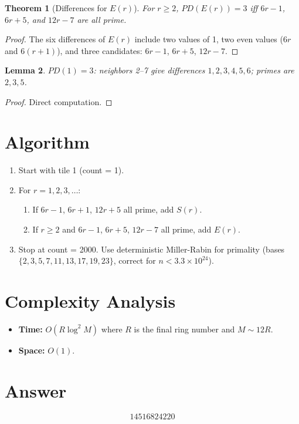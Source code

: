 \documentclass[11pt,a4paper]{article}
\newtheorem{theorem}{Theorem}
\newtheorem{lemma}[theorem]{Lemma}
\begin{document}
\begin{theorem}[Differences for $E(r)$]
For $r \ge 2$, $PD(E(r)) = 3$ iff $6r-1$, $6r+5$, and $12r-7$ are all prime.
\end{theorem}

\begin{proof}
The six differences of $E(r)$ include two values of 1, two even values ($6r$ and $6(r+1)$), and three candidates: $6r-1$, $6r+5$, $12r-7$.
\end{proof}

\begin{lemma}
$PD(1) = 3$: neighbors 2--7 give differences $1,2,3,4,5,6$; primes are $2,3,5$.
\end{lemma}

\begin{proof}
Direct computation.
\end{proof}

\section{Algorithm}

\begin{enumerate}
\item Start with tile 1 (count = 1).
\item For $r = 1, 2, 3, \ldots$:
\begin{enumerate}
\item If $6r-1$, $6r+1$, $12r+5$ all prime, add $S(r)$.
\item If $r \ge 2$ and $6r-1$, $6r+5$, $12r-7$ all prime, add $E(r)$.
\end{enumerate}
\item Stop at count = 2000. Use deterministic Miller-Rabin for primality (bases $\{2,3,5,7,11,13,17,19,23\}$, correct for $n < 3.3 \times 10^{24}$).
\end{enumerate}

\section{Complexity Analysis}

\begin{itemize}
\item \textbf{Time:} $O(R \log^2 M)$ where $R$ is the final ring number and $M \sim 12R$.
\item \textbf{Space:} $O(1)$.
\end{itemize}

\section{Answer}

\[
\boxed{14516824220}
\]
\end{document}
